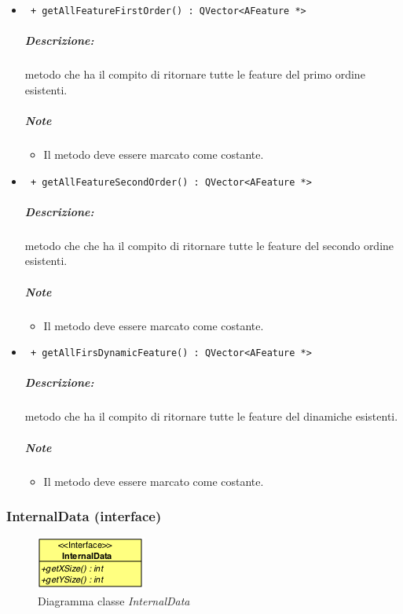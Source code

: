 \begin{itemize}
	\item \color{blue}\verb! + getAllFeatureFirstOrder() : QVector<AFeature *> !\\
	\color{black}
	\subparagraph{Descrizione:} metodo  che ha il compito di ritornare tutte le feature\g{} del primo ordine esistenti.
	\subparagraph{Note}
		\begin{itemize}
			\item Il metodo deve essere marcato come costante.
		\end{itemize}
		
	\item \color{blue}\verb! + getAllFeatureSecondOrder() : QVector<AFeature *> !\\
		\color{black} 
		\subparagraph{Descrizione:} metodo che che ha il compito di ritornare tutte le feature\g{} del secondo ordine esistenti.
		\subparagraph{Note}
			\begin{itemize}
				\item Il metodo deve essere marcato come costante.
			\end{itemize}

	\item \color{blue}\verb! + getAllFirsDynamicFeature() : QVector<AFeature *> !\\
		\color{black} 
		\subparagraph{Descrizione:} metodo  che ha il compito di ritornare tutte le feature\g{} del dinamiche esistenti.
		\subparagraph{Note}
			\begin{itemize}
				\item Il metodo deve essere marcato come costante.
			\end{itemize}
		
	\end{itemize}

	\pagebreak
\color{black}
\subsubsection{InternalData (interface)}
\label{InternalData}
\begin{figure}[!h]
\centering
			\includegraphics[scale=1]{./Content/Immagini/modelCore/InternalData.png}
			\caption{Diagramma classe \textsl{InternalData}}
			\label{InternalData_img}
\end{figure}

